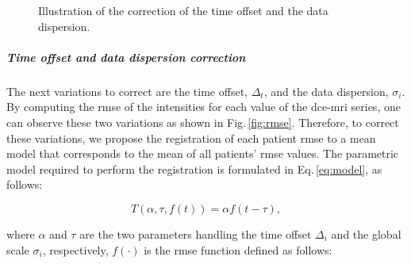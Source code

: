 \documentclass[a4paper,num-refs]{wiley-article}
\begin{document}
\begin{figure}
  \centering
  \hspace*{\fill}
   \hfill
  \hspace*{\fill}
  \caption{Illustration of the correction of the time offset and the data
    dispersion.}
  \label{fig:curveal}
\end{figure}

\subparagraph{Time offset and data dispersion correction} The next variations to
correct are the time offset, $\Delta_t$, and the data dispersion,
$\sigma_i$. By computing the \ac{rmse} of the intensities for each value of the
\ac{dce}-\ac{mri} series, one can observe these two variations as shown in
Fig.\,\ref{fig:rmse}. Therefore, to correct these variations, we propose the
registration of each patient \ac{rmse} to a mean model that corresponds to the
mean of all patients' \ac{rmse} values. The parametric model required to
perform the registration is formulated in Eq.\,\eqref{eq:model}, as follows:

\begin{equation}
  T(\alpha, \tau, f(t)) = \alpha f(t - \tau) ,
  \label{eq:model}
\end{equation}

\noindent where $\alpha$ and $\tau$ are the two parameters handling the time
offset $\Delta_i$ and the global scale $\sigma_i$, respectively, $f(\cdot)$ is
the \ac{rmse} function defined as follows:
\end{document}
